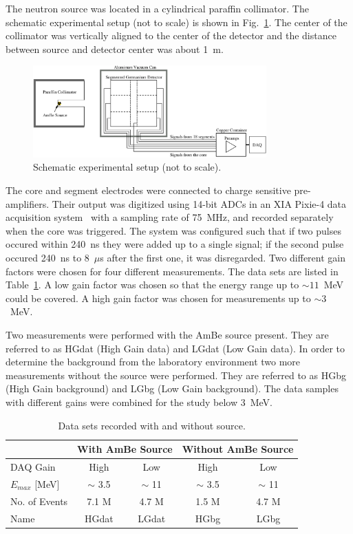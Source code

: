 The neutron source was located in a cylindrical paraffin
collimator. The schematic experimental setup (not to scale) is shown
in Fig.~\ref{fig:neu:exp}. The center of the collimator was vertically
aligned to the center of the detector and the distance between source
and detector center was about 1~m.

\begin{figure}[tbhp]
  \centering
  \includegraphics[width=0.8\textwidth]{neuExpSI}
  \caption{Schematic experimental setup (not to scale).}
  \label{fig:neu:exp}
\end{figure}

The core and segment electrodes were connected to charge sensitive pre-amplifiers. Their output was digitized using 14-bit ADCs in an XIA Pixie-4 data acquisition system~\cite{Daq06} with a sampling rate of 75~MHz, and recorded separately when the core was triggered. The system was configured such that if two pulses occured within 240~ns they were added up to a single signal; if the second pulse occured 240~ns to 8~$\mu$s after the first one, it was disregarded. Two different gain factors were chosen for four different measurements. The data sets are listed in Table~\ref{tab:neu:datset}. A low gain factor was chosen so that the energy range up to $\sim 11$~MeV could be covered. A high gain factor was chosen for measurements up to $\sim 3$~MeV.

Two measurements were performed with the AmBe source present. They are
referred to as HGdat (High Gain data) and LGdat (Low Gain data). In
order to determine the background from the laboratory environment two
more measurements without the source were performed. They are referred
to as HGbg (High Gain background) and LGbg (Low Gain background). The
data samples with different gains were combined for the study below
3~MeV.

\begin{table}[tbhp]
  \caption{Data sets recorded with and without source.} 
  \label{tab:neu:datset}\centering
  \begin{tabular}{lcccc}\hline
    & \multicolumn{2}{c}{With AmBe Source} &
\multicolumn{2}{c}{Without AmBe Source} \\
    \hline
    DAQ Gain & High  & Low   & High  & Low  \\
    $E_{max}$ [MeV] & $\sim$ 3.5  & $\sim$ 11 & $\sim$ 3.5 & $\sim$ 11
\\
    No. of Events & 7.1 M & 4.7 M & 1.5 M & 4.7 M \\
    Name & HGdat & LGdat & HGbg & LGbg \\\hline
  \end{tabular}
\end{table}

